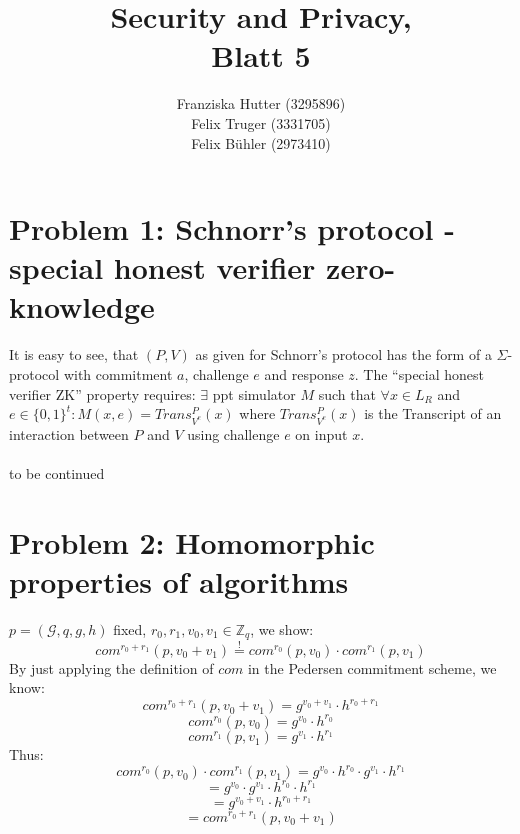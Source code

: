\documentclass[12pt,pdftex,a4paper]{article}
\title{Security and Privacy,\\ Blatt 5}
\author{Franziska Hutter (3295896)\\
	Felix Truger (3331705)\\
	Felix Bühler (2973410)}
\begin{document}
\maketitle
\pagebreak

\section*{Problem 1: Schnorr’s protocol - special honest verifier zero-knowledge}


It is easy to see, that $(P, V)$ as given for Schnorr’s protocol has the form of a $\Sigma$-protocol with commitment $a$, challenge $e$ and response $z$.
The ``special honest verifier ZK'' property requires: $\exists$ ppt simulator $M$ such that $\forall x\in L_R$ and $e\in \{0,1\}^t: M(x, e) = Trans_{V^e}^P(x)$ where $Trans_{V^e}^P(x)$ is the Transcript of an interaction between $P$ and $V$ using challenge $e$ on input $x$.
\\~\\to be continued

\section*{Problem 2: Homomorphic properties of algorithms}
$p=(\mathcal{G},q,g,h)$ fixed, $r_0, r_1, v_0, v_1 \in \mathbb{Z}_q$, we show:
$$com^{r_0+r_1}(p, v_0 + v_1) \overset{!}{=} com^{r_0}(p, v_0) \cdot com^{r_1}(p, v_1)$$
By just applying the definition of $com$ in the Pedersen commitment scheme, we know:
$$com^{r_0+r_1}(p, v_0 + v_1) = g^{v_0 + v_1}\cdot h^{r_0+r_1}$$
$$com^{r_0}(p, v_0) = g^{v_0} \cdot h^{r_0}$$
$$com^{r_1}(p, v_1) = g^{v_1} \cdot h^{r_1}$$
Thus:
$$com^{r_0}(p, v_0) \cdot com^{r_1}(p, v_1) = g^{v_0} \cdot h^{r_0} \cdot g^{v_1} \cdot h^{r_1}$$
$$= g^{v_0}\cdot g^{v_1}\cdot h^{r_0}\cdot h^{r_1}$$
$$= g^{v_0 + v_1}\cdot h^{r_0+r_1}$$
$$= com^{r_0+r_1}(p, v_0 + v_1)$$

\end{document}

